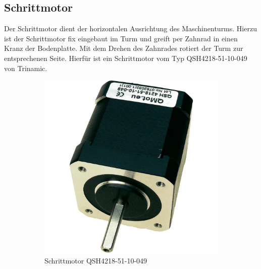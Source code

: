 \subsection{Schrittmotor}
Der Schrittmotor dient der horizontalen Ausrichtung des Maschinenturms.
Hierzu ist der Schrittmotor fix eingebaut im Turm und greift per Zahnrad
in einen Kranz der Bodenplatte. Mit dem Drehen des Zahnrades rotiert der
Turm zur entsprechenen Seite. Hierfür ist ein Schrittmotor vom Typ 
QSH4218-51-10-049 von Trinamic.

\begin{figure}[h!]
	\centering
	\begin{subfigure}[b]{0.45\textwidth}
		\centering
		\includegraphics[width=1\textwidth]{../../fig/et/QSH4218-51-10-049.jpg}
		\caption{Schrittmotor QSH4218-51-10-049}
	\end{subfigure}
	\begin{subfigure}[b]{0.45\textwidth}
		\centering

\end{subfigure}
\end{figure}
